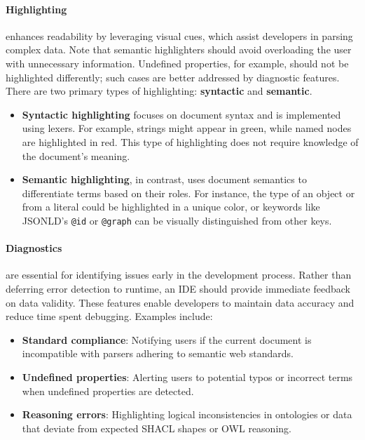 \paragraph*{Highlighting} enhances readability by leveraging visual cues, which assist developers in parsing complex data. 
Note that semantic highlighters should avoid overloading the user with unnecessary information. 
Undefined properties, for example, should not be highlighted differently; such cases are better addressed by diagnostic features.
There are two primary types of highlighting: \textbf{syntactic} and \textbf{semantic}.

\begin{itemize}
    \item \textbf{Syntactic highlighting} focuses on document syntax and is implemented using lexers. For example, strings might appear in green, while named nodes are highlighted in red. This type of highlighting does not require knowledge of the document’s meaning.
    \item \textbf{Semantic highlighting}, in contrast, uses document semantics to differentiate terms based on their roles. For instance, the type of an object or from a literal could be highlighted in a unique color, or keywords like JSONLD's \texttt{@id} or \texttt{@graph} can be visually distinguished from other keys.
\end{itemize}


\paragraph*{Diagnostics} are essential for identifying issues early in the development process. 
Rather than deferring error detection to runtime, an IDE should provide immediate feedback on data validity.
These features enable developers to maintain data accuracy and reduce time spent debugging. Examples include:

\begin{itemize}
    \item \textbf{Standard compliance}: Notifying users if the current document is incompatible with parsers adhering to semantic web standards.
    \item \textbf{Undefined properties}: Alerting users to potential typos or incorrect terms when undefined properties are detected.
    \item \textbf{Reasoning errors}: Highlighting logical inconsistencies in ontologies or data that deviate from expected SHACL shapes or OWL reasoning.
\end{itemize}


